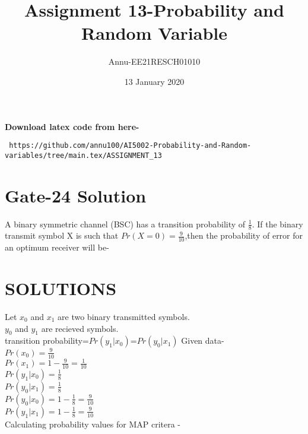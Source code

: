 \documentclass[journel,12pt,twocoloums]{IEEEtran}
\title{Assignment 13-Probability and Random Variable}
\author{Annu-EE21RESCH01010}
\date{13 January 2020}
\begin{document}
 \maketitle
\textbf{Download latex code from here-}\\
\begin{lstlisting}
 https://github.com/annu100/AI5002-Probability-and-Random-variables/tree/main.tex/ASSIGNMENT_13
 \end{lstlisting}

 \section{Gate-24 Solution}

A binary symmetric channel (BSC) has a transition
probability of $\frac{1}{8}$. If the binary transmit
symbol X is such that $Pr(X=0)=\frac{9}{10}$,then
the probability of error for an optimum receiver
will be-

\section{SOLUTIONS}
\begin{flushleft}
Let $x_0$ and $x_1$ are two binary transmitted symbols.\\
$y_0$ and $y_1$ are recieved symbols.\\
transition probability=$Pr(y_1|x_0)$=$Pr(y_0|x_1)$
Given data-\\
$Pr(x_0)=\frac{9}{10}$\\
$Pr(x_1)=1-\frac{9}{10}=\frac{1}{10}$\\
$Pr(y_1|x_0)=\frac{1}{8}$\\
$Pr(y_0|x_1)=\frac{1}{8}$\\
$Pr(y_0|x_0)=1-\frac{1}{8}=\frac{9}{10}$\\
$Pr(y_1|x_1)=1-\frac{1}{8}=\frac{9}{10}$\\
Calculating probability values for MAP critera -
\end{flushleft}
\end{document}
